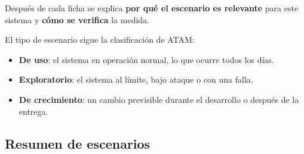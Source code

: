 Después de cada ficha se explica \textbf{por qué el escenario es relevante} para este sistema y \textbf{cómo se verifica} la medida.

El tipo de escenario sigue la clasificación de ATAM:

\begin{itemize}
  \item \textbf{De uso}: el sistema en operación normal, lo que ocurre todos los días.
  \item \textbf{Exploratorio}: el sistema al límite, bajo ataque o con una falla.
  \item \textbf{De crecimiento}: un cambio previsible durante el desarrollo o después de la entrega.
\end{itemize}

\subsection{Resumen de escenarios}

